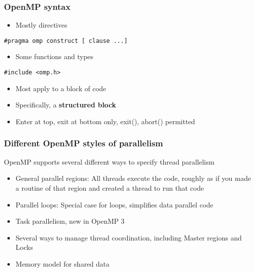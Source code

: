 \documentclass{beamer}
\begin{document}
\begin{frame}
\frametitle{OpenMP syntax}

\begin{itemize}
\item Mostly directives
\end{itemize}

\noindent


\begin{verbatim}
#pragma omp construct [ clause ...]

\end{verbatim}

\begin{itemize}
 \item Some functions and types 
\end{itemize}

\noindent


\begin{verbatim}
#include <omp.h>

\end{verbatim}

\begin{itemize}
 \item Most apply to a block of code

 \item Specifically, a \textbf{structured block}

 \item Enter at top, exit at bottom only, exit(), abort() permitted
\end{itemize}

\noindent
\end{frame}

\begin{frame}
\frametitle{Different OpenMP styles of parallelism}

OpenMP supports several different ways to specify thread parallelism

\begin{itemize}
\item General parallel regions: All threads execute the code, roughly as if you made a routine of that region and created a thread to run that code

\item Parallel loops: Special case for loops, simplifies data parallel code

\item Task parallelism, new in OpenMP 3

\item Several ways to manage thread coordination, including Master regions and Locks

\item Memory model for shared data
\end{itemize}

\noindent
\end{frame}
\end{document}

